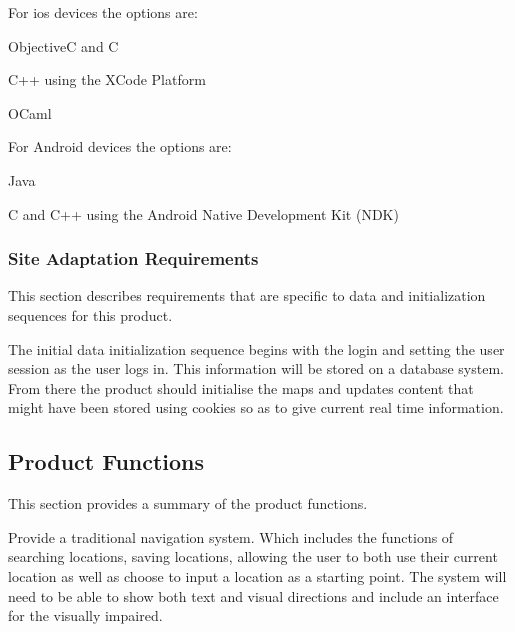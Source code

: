 \documentclass[12pt]{article}
\begin{document}
		

		For ios devices the options are:

		\begin{list}{}{}

			

			\item ObjectiveC and C

			\item C++ using the XCode Platform

			\item OCaml

		\end{list} 

	

		For Android devices the options are:

			\begin{list}{}{}

				\item Java

				\item C and C++ using the Android Native Development Kit (NDK)

			\end{list}



\subsubsection{Site Adaptation Requirements}


This section describes requirements that are specific to data and initialization sequences for this product.

The initial data initialization sequence begins with the login and setting the user session as the user logs in. This information will be stored on a database system. From there the product should initialise the maps and updates content that might have been stored using cookies so as to give current real time information.

\subsection{Product Functions}


This section provides a summary of the product functions.

	

Provide a traditional navigation system. Which includes the functions of searching locations, saving locations, allowing the user to both use their current location as well as choose to input a location as a starting point. The system will need to be able to show both text and visual directions and include an interface for the visually impaired.
\end{document}
